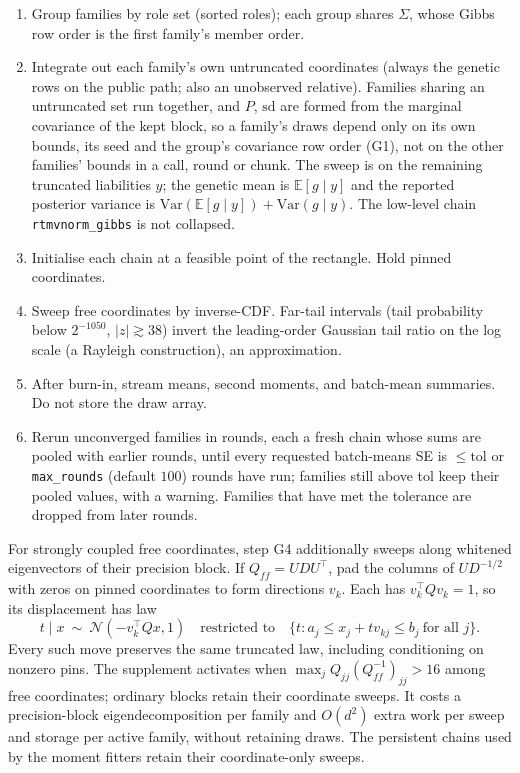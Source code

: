 \documentclass[11pt,a4paper]{article}
\newcommand{\E}{\mathbb{E}}
\newcommand{\Var}{\mathrm{Var}}
\begin{document}
\begin{enumerate}
\item[G1.] Group families by role set (sorted roles); each group shares
  $\Sigma$, whose Gibbs row order is the first family's member order.
\item[G2.] Integrate out each family's own untruncated coordinates
  (always the genetic rows on the public path; also an unobserved
  relative). Families sharing an untruncated set run together, and
  $P$, $\mathrm{sd}$ are formed from the marginal covariance of the
  kept block, so a family's draws depend only on its own bounds, its seed and the
  group's covariance row order (G1), not on the other families' bounds in a
  call, round or chunk.
  The sweep is on the remaining truncated liabilities $y$;
  the genetic mean is $\E[g\mid y]$ and the reported posterior
  variance is $\Var(\E[g\mid y])+\Var(g\mid y)$.
  The low-level chain \texttt{rtmvnorm\_gibbs} is not collapsed.
\item[G3.] Initialise each chain at a feasible point of the
  rectangle. Hold pinned coordinates.
\item[G4.] Sweep free coordinates by inverse-CDF.
  Far-tail intervals (tail probability below $2^{-1050}$, $|z|\gtrsim 38$)
  invert the leading-order Gaussian tail ratio on the log scale
  (a Rayleigh construction), an approximation.
\item[G5.] After burn-in, stream means, second moments, and
  batch-mean summaries. Do not store the draw array.
\item[G6.] Rerun unconverged families in rounds, each a fresh
  chain whose sums are pooled with earlier rounds, until every
  requested batch-means SE \cite{jones2006} is $\le\mathrm{tol}$ or
  \texttt{max\_rounds} (default $100$) rounds have run; families still above
  tol keep their pooled values, with a warning.
  Families that have met the tolerance are dropped from later
  rounds.
\end{enumerate}
For strongly coupled free coordinates, step G4 additionally sweeps along
whitened eigenvectors of their precision block. If $Q_{ff}=UDU^\top$,
pad the columns of $UD^{-1/2}$ with zeros on pinned coordinates to form
directions $v_k$. Each has $v_k^\top Qv_k=1$, so its displacement has law
\begin{equation}
  t\mid x\ \sim\ \mathcal{N}(-v_k^\top Qx,1)
  \quad\text{restricted to}\quad
  \{t:a_j\le x_j+t v_{kj}\le b_j\ \text{for all }j\}.
  \label{eq:joint-gibbs}
\end{equation}
Every such move preserves the same truncated law, including conditioning on
nonzero pins. The supplement activates when
$\max_j Q_{jj}(Q_{ff}^{-1})_{jj}>16$ among free coordinates;
ordinary blocks retain their coordinate sweeps. It costs a precision-block
eigendecomposition per family and $O(d^2)$ extra work per sweep and storage
per active family, without retaining draws. The persistent chains used by
the moment fitters retain their coordinate-only sweeps.
\end{document}
